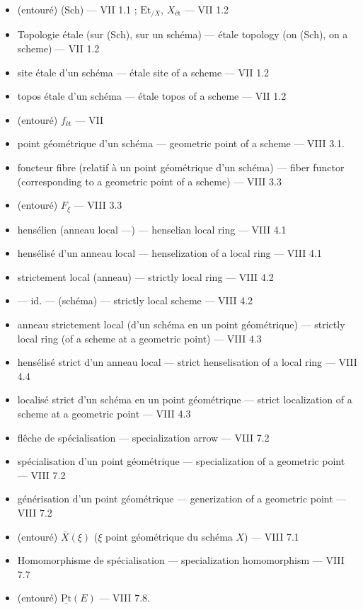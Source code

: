 \documentclass[11pt,a4paper]{article}
\begin{document}
\begin{itemize}
\item (entouré) (Sch) --- VII 1.1 ; $\mathrm{Et}_{/X}$, $X_{\text{ét}}$ ---
VII 1.2
\item Topologie étale (sur (Sch), sur un schéma) --- étale topology (on (Sch),
on a scheme) --- VII 1.2
\item site étale d'un schéma --- étale site of a scheme --- VII 1.2
\item topos étale d'un schéma --- étale topos of a scheme --- VII 1.2
\item (entouré) $f_{\text{ét}}$ --- VII 
\item point géométrique d'un schéma --- geometric point of a scheme --- VIII 3.1.
\item foncteur fibre (relatif à un point géométrique d'un schéma) --- fiber
functor (corresponding to a geometric point of a scheme) --- VIII 3.3
\item (entouré) $F_{\xi}$ --- VIII 3.3
\item hensélien (anneau local ---) --- henselian local ring --- VIII 4.1
\item hensélisé d'un anneau local --- henselization of a local ring --- VIII 4.1
\item strictement local (anneau) --- strictly local ring --- VIII 4.2
\item --- id. --- (schéma) --- strictly local scheme --- VIII 4.2
\item anneau strictement local (d'un schéma en un point géométrique) ---
strictly local ring (of a scheme at a geometric point) --- VIII 4.3
\item hensélisé strict d'un anneau local --- strict henselisation of a local
ring --- VIII 4.4
\item localisé strict d'un schéma en un point géométrique --- strict
localization of a scheme at a geometric point --- VIII 4.3
\item flêche de spécialisation --- specialization arrow --- VIII 7.2
\item spécialisation d'un point géométrique --- specialization of a geometric
point --- VIII 7.2
\item générisation d'un point géométrique --- generization of a geometric point
--- VIII 7.2
\item (entouré) $\overline{X}(\xi)$ ($\xi$ point géométrique du schéma $X$) ---
VIII 7.1
\item Homomorphisme de spécialisation --- specialization homomorphism --- VIII
7.7
\item (entouré) $\underline{\mathrm{Pt}}(E)$ --- VIII 7.8.
\end{itemize}
\end{document}
